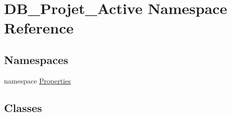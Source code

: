 \hypertarget{namespace_d_b___projet___active}{}\section{D\+B\+\_\+\+Projet\+\_\+\+Active Namespace Reference}
\label{namespace_d_b___projet___active}
\subsection*{Namespaces}
\begin{DoxyCompactItemize}
\item 
namespace \mbox{\hyperlink{namespace_d_b___projet___active_1_1_properties}{Properties}}
\end{DoxyCompactItemize}
\subsection*{Classes}
